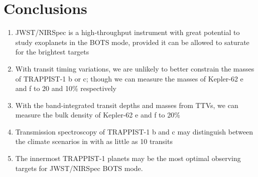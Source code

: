 \section{Conclusions}

\begin{enumerate}
    \item JWST/NIRSpec is a high-throughput instrument with great potential to study exoplanets in the BOTS mode, provided it can be allowed to saturate for the brightest targets
    \item With transit timing variations, we are unlikely to better constrain the masses of TRAPPIST-1 b or c; though we can measure the masses of Kepler-62 e and f to 20 and 10\% respectively
    \item With the band-integrated transit depths and masses from TTVs, we can measure the bulk density of Kepler-62 e and f to 20\%
    \item Transmission spectroscopy of TRAPPIST-1 b and c may distinguish between the climate scenarios in \citet{Lincowski2018} with as little as 10 transits
    \item The innermost TRAPPIST-1 planets may be the most optimal observing targets for JWST/NIRSpec BOTS mode.
\end{enumerate}

%
%
%
%
%
%
%
%


%

